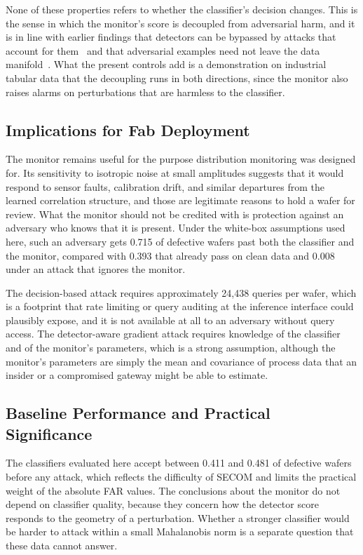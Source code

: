 \documentclass[preprint,12pt,authoryear]{elsarticle}
\begin{document}
None of these properties refers to whether the classifier's decision changes. This is the sense in which the monitor's score is decoupled from adversarial harm, and it is in line with earlier findings that detectors can be bypassed by attacks that account for them~\citep{carlini2017detect,tramer2020} and that adversarial examples need not leave the data manifold~\citep{stutz2019}. What the present controls add is a demonstration on industrial tabular data that the decoupling runs in both directions, since the monitor also raises alarms on perturbations that are harmless to the classifier.

\subsection{Implications for Fab Deployment}
The monitor remains useful for the purpose distribution monitoring was designed for. Its sensitivity to isotropic noise at small amplitudes suggests that it would respond to sensor faults, calibration drift, and similar departures from the learned correlation structure, and those are legitimate reasons to hold a wafer for review. What the monitor should not be credited with is protection against an adversary who knows that it is present. Under the white-box assumptions used here, such an adversary gets 0.715 of defective wafers past both the classifier and the monitor, compared with 0.393 that already pass on clean data and 0.008 under an attack that ignores the monitor.

The decision-based attack requires approximately 24,438 queries per wafer, which is a footprint that rate limiting or query auditing at the inference interface could plausibly expose, and it is not available at all to an adversary without query access. The detector-aware gradient attack requires knowledge of the classifier and of the monitor's parameters, which is a strong assumption, although the monitor's parameters are simply the mean and covariance of process data that an insider or a compromised gateway might be able to estimate.

\subsection{Baseline Performance and Practical Significance}
The classifiers evaluated here accept between 0.411 and 0.481 of defective wafers before any attack, which reflects the difficulty of SECOM and limits the practical weight of the absolute FAR values. The conclusions about the monitor do not depend on classifier quality, because they concern how the detector score responds to the geometry of a perturbation. Whether a stronger classifier would be harder to attack within a small Mahalanobis norm is a separate question that these data cannot answer.
\end{document}
